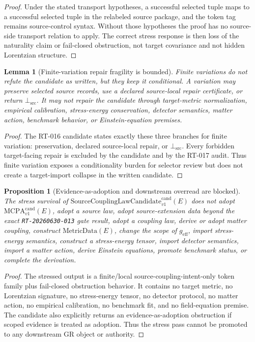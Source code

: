 \documentclass[11pt]{article}
\newcommand{\MetricData}{\mathrm{MetricData}}
\newcommand{\geff}{g_{\mathrm{eff}}}
\newcommand{\MCPA}{\mathrm{MCPA}^{\mathrm{cand}}_{v1}}
\newcommand{\SourceCoupCand}{\mathrm{SourceCouplingLawCandidate}^{\mathrm{cand}}_{v1}}
\newcommand{\BottomSrc}{\bot_{\mathrm{src}}}
\newtheorem{lemma}{Lemma}
\newtheorem{proposition}{Proposition}
\begin{document}
\begin{proof}
Under the stated transport hypotheses, a successful selected tuple maps to a
successful selected tuple in the relabeled source package, and the token tag
remains source-control syntax. Without those hypotheses the proof has no
source-side transport relation to apply. The correct stress response is then
loss of the naturality claim or fail-closed obstruction, not target covariance
and not hidden Lorentzian structure.
\end{proof}

\begin{lemma}[Finite-variation repair fragility is bounded]
Finite variations do not refute the candidate as written, but they keep it
conditional. A variation may preserve selected source records, use a declared
source-local repair certificate, or return \(\BottomSrc\). It may not repair
the candidate through target-metric normalization, empirical calibration,
stress-energy conservation, detector semantics, matter action, benchmark
behavior, or Einstein-equation premises.
\end{lemma}

\begin{proof}
The RT-016 candidate states exactly these three branches for finite
variation: preservation, declared source-local repair, or \(\BottomSrc\).
Every forbidden target-facing repair is excluded by the candidate and by the
RT-017 audit. Thus finite variation exposes a conditionality burden for
selector review but does not create a target-import collapse in the written
candidate.
\end{proof}

\begin{proposition}[Evidence-as-adoption and downstream overread are blocked]
The stress survival of \(\SourceCoupCand(E)\) does not adopt
\(\MCPA(E)\), adopt a source law, adopt source-extension data beyond the
exact \texttt{RT-20260630-013} gate result, adopt a coupling law, derive or
adopt matter coupling, construct \(\MetricData(E)\), change the scope of
\(\geff\), import stress-energy semantics, construct a stress-energy tensor,
import detector semantics, import a matter action, derive Einstein equations,
promote benchmark status, or complete the derivation.
\end{proposition}

\begin{proof}
The stressed output is a finite/local source-coupling-intent-only token family
plus fail-closed obstruction behavior. It contains no target metric, no
Lorentzian signature, no stress-energy tensor, no detector protocol, no
matter action, no empirical calibration, no benchmark fit, and no
field-equation premise. The candidate also explicitly returns an
evidence-as-adoption obstruction if scoped evidence is treated as adoption.
Thus the stress pass cannot be promoted to any downstream GR object or
authority.
\end{proof}
\end{document}
